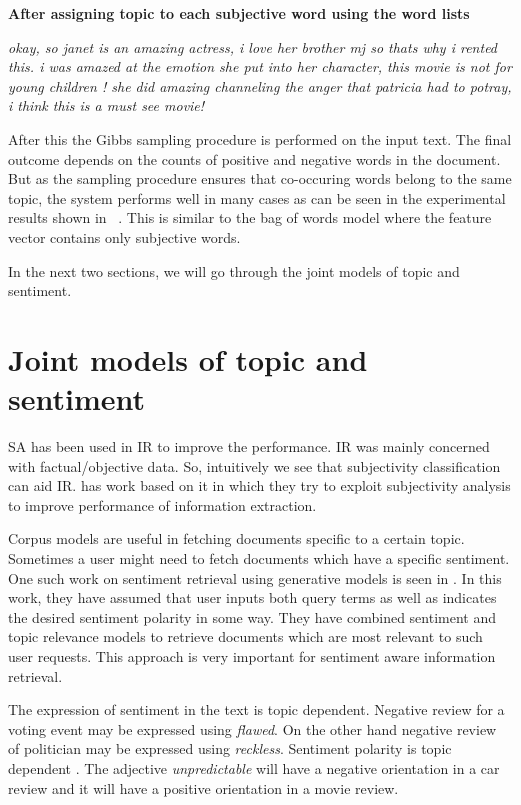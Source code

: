 \textbf{After assigning topic to each subjective word using the word lists}

\textit{ {\color[rgb]{0.4,0.4,0.4}okay, so janet is an} {\color{green}amazing} {\color[rgb]{0.4,0.4,0.4}actress, i} {\color{green}love} {\color[rgb]{0.4,0.4,0.4}her 
brother mj so thats why i rented this. i was} {\color{green}amazed} {\color[rgb]{0.4,0.4,0.4}at the emotion she put into her character, this movie is not for young 
children ! she did} {\color{green}amazing} {\color[rgb]{0.4,0.4,0.4}channeling the} {\color{red}anger} {\color[rgb]{0.4,0.4,0.4}that patricia had to potray, i think 
this is a must see movie! }}

After this the Gibbs sampling procedure is performed on the input text. The final outcome depends on the counts of positive and negative words in the document. But as the 
sampling procedure ensures that co-occuring words belong to the same topic, the system performs well in many cases as can be seen in the experimental results shown in
~. This is similar to the bag of words model where the feature vector contains only subjective words.

In the next two sections, we will go through the joint models of topic and sentiment.

\section{Joint models of topic and sentiment}

SA has been used in IR to improve the performance. IR was mainly concerned with factual/objective data. So, intuitively we see that subjectivity classification 
can aid IR. \citep*{riloff2005exploiting} has work based on it in which they try to exploit subjectivity analysis to improve performance of information extraction. 

Corpus models are useful in fetching documents specific to a certain topic. Sometimes a user might need to fetch documents which have a specific sentiment. One 
such work on sentiment retrieval using generative models is seen in \citep*{eguchi2006sentiment}. In this work, they have assumed that user inputs both query 
terms as well as indicates the desired sentiment polarity in some way. They have combined sentiment and topic relevance models to retrieve documents which are most
relevant to such user requests. This approach is very important for sentiment aware information retrieval.

The expression of sentiment in the text is topic dependent. Negative review for a voting event may be expressed using \textit{flawed}. On the other hand negative 
review of politician may be expressed using \textit{reckless}. Sentiment polarity is topic dependent \citep*{engstrom2004topic}. The adjective \textit{unpredictable}
will have a negative orientation in a car review and it will have a positive orientation in a movie review. 

